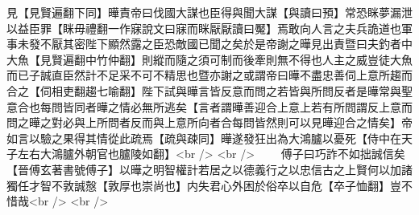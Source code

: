 見【見賢遍翻下同】曄責帝曰伐國大謀也臣得與聞大謀【與讀曰預】常恐眯夢漏泄以益臣罪【眯毋禮翻一作寐說文曰寐而眯厭厭讀曰魘】焉敢向人言之夫兵詭道也軍事未發不厭其密陛下顯然露之臣恐敵國已聞之矣於是帝謝之曄見出責暨曰夫釣者中大魚【見賢遍翻中竹仲翻】則縱而隨之須可制而後牽則無不得也人主之威豈徒大魚而已子誠直臣然計不足采不可不精思也暨亦謝之或謂帝曰曄不盡忠善伺上意所趨而合之【伺相吏翻趨七喻翻】陛下試與曄言皆反意而問之若皆與所問反者是曄常與聖意合也每問皆同者曄之情必無所逃矣【言者謂曄善迎合上意上若有所問謂反上意而問之曄之對必與上所問者反而與上意所向者合每問皆然則可以見曄迎合之情矣】帝如言以驗之果得其情從此疏焉【疏與疎同】曄遂發狂出為大鴻臚以憂死【侍中在天子左右大鴻臚外朝官也臚陵如翻】<br />
<br />
　　傅子曰巧詐不如拙誠信矣【晉傅玄著書號傅子】以曄之明智權計若居之以德義行之以忠信古之上賢何以加諸獨任才智不敦誠慤【敦厚也崇尚也】内失君心外困於俗卒以自危【卒子恤翻】豈不惜哉<br />
<br />

